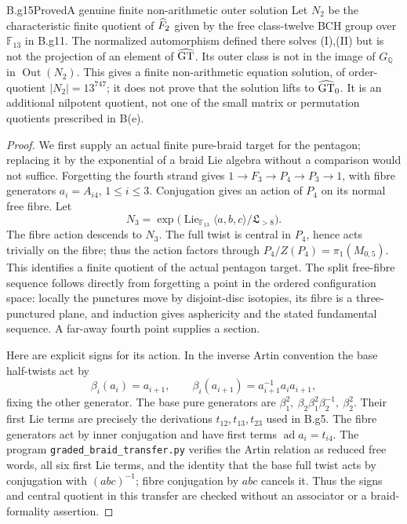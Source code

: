 \begin{claim}{B.g15}{Proved}{A genuine finite non-arithmetic outer solution}
Let $N_2$ be the characteristic finite quotient of $\widehat F_2$ given by
the free class-twelve BCH group over $\mathbb F_{13}$ in B.g11.
The normalized automorphism defined there solves (I),(II) but is not
the projection of an element of $\widehat{\mathrm{GT}}$.  Its outer class is not in
the image of $G_{\mathbb Q}$ in $\operatorname{Out}(N_2)$.
This gives a finite non-arithmetic equation solution, of order-quotient
$|N_2|=13^{747}$; it does not prove that the solution lifts to $\widehat{\mathrm{GT}}_0$.
It is an additional nilpotent quotient, not one of the small matrix
or permutation quotients prescribed in B(e).
\end{claim}

\begin{proof}
We first supply an actual finite pure-braid target for the pentagon;
replacing it by the exponential of a braid Lie algebra without a
comparison would not suffice.
Forgetting the fourth strand gives
$1\to F_3\to P_4\to P_3\to1$, with fibre generators
$a_i=A_{i4}$, $1\leq i\leq3$.
Conjugation gives an action of $P_4$ on its normal free fibre.
Let
\[
 N_3=\exp\bigl(\operatorname{Lie}_{\mathbb F_{13}}
                 \langle a,b,c\rangle/\mathfrak L_{>8}\bigr).
\]
The fibre action descends to $N_3$.  The full twist is central in
$P_4$, hence acts trivially on the fibre; thus the action factors
through $P_4/Z(P_4)=\pi_1(M_{0,5})$.
This identifies a finite quotient of the actual pentagon target.
The split free-fibre sequence follows directly from forgetting a
point in the ordered configuration space: locally the punctures
move by disjoint-disc isotopies, its fibre is a three-punctured
plane, and induction gives asphericity and the stated fundamental
sequence.  A far-away fourth point supplies a section.

Here are explicit signs for its action.  In the inverse Artin
convention the base half-twists act by
\[
 \beta_i(a_i)=a_{i+1},\qquad
 \beta_i(a_{i+1})=a_{i+1}^{-1}a_i a_{i+1},
\]
fixing the other generator.  The base pure generators are
$\beta_1^2,\ \beta_2\beta_1^2\beta_2^{-1},\ \beta_2^2$.
Their first Lie terms are precisely the derivations $t_{12},t_{13},t_{23}$
used in B.g5.  The fibre generators act by inner conjugation and
have first terms $\operatorname{ad}a_i=t_{i4}$.
The program \texttt{graded\_braid\_transfer.py} verifies the Artin
relation as reduced free words, all six first Lie terms, and the
identity that the base full twist acts by conjugation with
$(abc)^{-1}$; fibre conjugation by $abc$ cancels it.
Thus the signs and central quotient in this transfer are checked
without an associator or a braid-formality assertion.


\end{proof}
